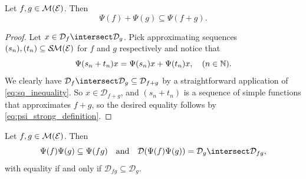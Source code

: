 \documentclass[article, a4paper, 11pt, oneside]{memoir}
\makeatletter
\numberwithin{equation}{chapter}
\newcommand{\calE}{\mathcal{E}}
\newcommand{\dom}{\mathcal{D}}
\theoremstyle{myexample}
\theoremstyle{myexample}
\theoremstyle{myexamplebreak}
\theoremstyle{myexamplebreak}
\theoremstyle{nonumberplain}
\newtheorem{proof}{\protect\@proof}
\theoremstyle{MyNonumberplain}
\newcommand{\@proof}{}
\renewcommand{\@proof}{Proof}%
\renewcommand{\@proof}{Bevis}%
\makeatother
\begin{document}
\begin{proposition}
    Let $f, g \in \measurable(\calE)$. Then
    \begin{equation*}
        \Psi(f) + \Psi(g) \subseteq \Psi(f+g).
    \end{equation*}
\end{proposition}

\begin{proof}
    Let $x \in \dom_f \intersect \dom_g$. Pick approximating sequences $(s_n), (t_n) \subseteq \simplemeas(\calE)$ for $f$ and $g$ respectively and notice that
    \begin{equation*}
        \Psi(s_n + t_n) x = \Psi(s_n)x + \Psi(t_n)x,
        \quad (n \in \mathbb{N}).
    \end{equation*}
    We clearly have $\dom_f \intersect \dom_g \subseteq \dom_{f+g}$ by a straightforward application of \eqref{eq:sq_inequality}. So $x \in \dom_{f+g}$, and $(s_n + t_n)$ is a sequence of simple functions that approximates $f+g$, so the desired equality follows by \eqref{eq:psi_strong_definition}.
\end{proof}


\begin{theorem}
    \label{thm:Psi_multiplication}
    Let $f,g \in \measurable(\calE)$. Then
    \begin{equation*}
        \Psi(f) \Psi(g) \subseteq \Psi(fg)
        \quad \text{and} \quad
        \dom(\Psi(f)\Psi(g)) = \dom_g \intersect \dom_{fg},
    \end{equation*}
    with equality if and only if $\dom_{fg} \subseteq \dom_g$.
\end{theorem}

\renewcommand{\implies}{\Rightarrow}
\end{document}
